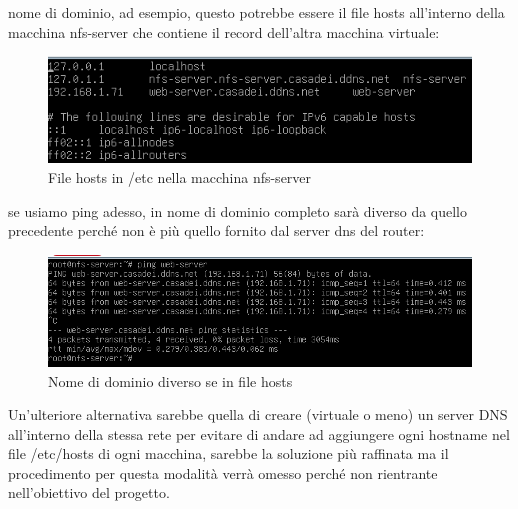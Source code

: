 \documentclass[a4paper]{article}
\begin{document}
nome di dominio, ad esempio, questo potrebbe essere il file hosts all'interno della macchina nfs-server che contiene il record dell'altra macchina virtuale:
\begin{figure}[H]
    \centering
    \includegraphics[scale=0.8]{images/HostsNfs.png}
    \caption{File hosts in /etc nella macchina nfs-server}
\end{figure}
se usiamo ping adesso, in nome di dominio completo sarà diverso da quello precedente perché non è più quello fornito dal server dns del router:
\begin{figure}[H]
    \centering
    \includegraphics[scale=0.60]{images/HostsNFSPing.png}
    \caption{Nome di dominio diverso se in file hosts}
\end{figure}
Un'ulteriore alternativa sarebbe quella di creare (virtuale o meno) un server DNS all'interno della stessa rete per evitare di andare ad aggiungere ogni
hostname nel file /etc/hosts di ogni macchina, sarebbe la soluzione più raffinata ma il procedimento per questa modalità verrà omesso perché non rientrante
nell'obiettivo del progetto.
\end{document}
